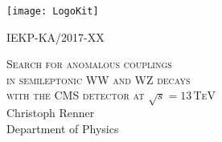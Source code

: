 \begin{titlepage}
  \begin{addmargin}[0cm]{0cm}
    \thispagestyle{empty}
    \vspace{-1cm}
    \begin{center}

	\end{center}
	
  		\begin{minipage}{0.5\textwidth}
  			\texttt{[image: LogoKit]}
  		\end{minipage}%
  		\begin{minipage}{0.5\textwidth}
  			\hspace{3.5cm}IEKP-KA/2017-XX
  		\end{minipage}
  		
	
	\vspace{2cm}
	\begin{center}

	\vspace{0.8cm}

	\Large{\textsc{Search for anomalous couplings\\in semileptonic WW and WZ decays\\with the CMS detector at $\sqrt{s}=13$\,TeV}}\\
	\vspace{0.9cm}
	\Large{Christoph Renner}\\
	\vspace{0.9cm}
	\vspace{1cm}
	\large{Department of Physics\\
  
}
\end{center}
\end{addmargin}
\end{titlepage}

